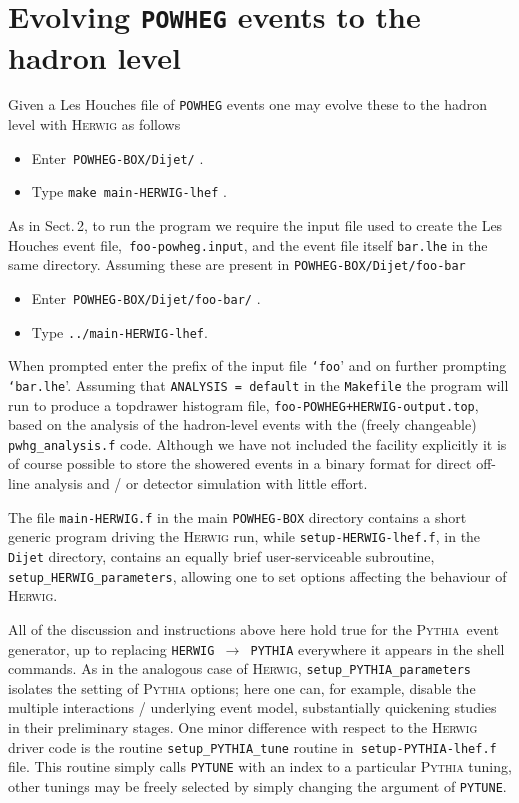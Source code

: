 \documentclass[paper]{JHEP3}
\newcommand\POWHEG{{\tt POWHEG}}
\begin{document}
\section{Evolving \POWHEG{} events to the hadron level}

Given a Les Houches file of \POWHEG{} events one may evolve
these to the hadron level with \textsc{Herwig} as follows 
\begin{itemize}
\item Enter\texttt{ POWHEG-BOX/Dijet/} .
\item Type \texttt{make main-HERWIG-lhef} .
\end{itemize}
\noindent As in Sect.\,2, to run the program we require the input
file used to create the Les Houches event file,\texttt{ foo-powheg.input},
and the event file itself \texttt{bar.lhe} in the same directory.
Assuming these are present in \texttt{POWHEG-BOX/Dijet/foo-bar}
\begin{itemize}
\item Enter\texttt{ POWHEG-BOX/Dijet/foo-bar/} .
\item Type \texttt{../main-HERWIG-lhef}.
\end{itemize}
When prompted enter the prefix of the input file \texttt{`foo}' and
on further prompting \texttt{`bar.lhe}'. Assuming that \texttt{ANALYSIS
= default} in the \texttt{Makefile} the program will run to produce
a topdrawer histogram file, \texttt{foo-POWHEG+HERWIG-output.top},
based on the analysis of the hadron-level events with the (freely
changeable) \texttt{pwhg\_analysis.f} code. Although we have not included
the facility explicitly it is of course possible to store the showered
events in a binary format for direct off-line analysis and / or detector
simulation with little effort.

The file \texttt{main-HERWIG.f} in the main {\tt POWHEG-BOX}
directory contains a short generic program driving the \textsc{Herwig}
run, while \texttt{setup-HERWIG-lhef.f}, in the \texttt{Dijet} directory,
contains an equally brief user-serviceable subroutine, \texttt{setup\_HERWIG\_parameters},
allowing one to set options affecting the behaviour of \textsc{Herwig}. 

All of the discussion and instructions above here hold true for the
\textsc{Pythia}\texttt{ }event generator, up to replacing \texttt{HERWIG
$\rightarrow$ PYTHIA} everywhere it appears in the shell commands.
As in the analogous case of \textsc{Herwig}, \texttt{setup\_PYTHIA\_parameters}
isolates the setting of \textsc{Pythia} options; here one can, for
example, disable the multiple interactions / underlying event model,
substantially quickening studies in their preliminary stages. One
minor difference with respect to the \textsc{Herwig} driver code is
the routine \texttt{setup\_PYTHIA\_tune} routine in\texttt{ setup-PYTHIA-lhef.f}
file. This routine simply calls \texttt{PYTUNE} with an index to a
particular \textsc{Pythia} tuning, other tunings may be freely selected
by simply changing the argument of \texttt{PYTUNE}.
\end{document}
